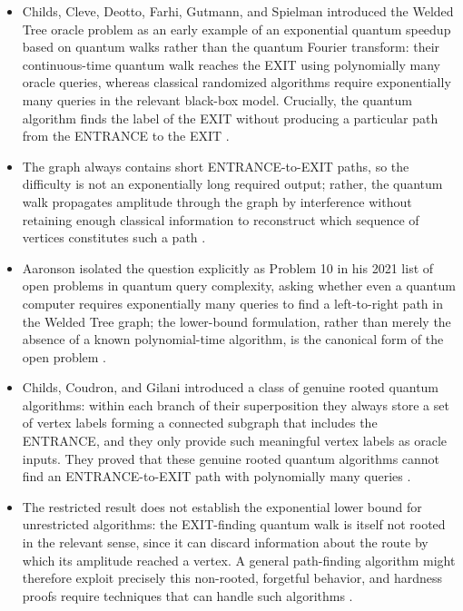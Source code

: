 \begin{itemize}
  \item Childs, Cleve, Deotto, Farhi, Gutmann, and Spielman introduced the Welded
Tree oracle problem as an early example of an exponential quantum speedup
based on quantum walks rather than the quantum Fourier transform: their
continuous-time quantum walk reaches the EXIT using polynomially many oracle
queries, whereas classical randomized algorithms require exponentially many
queries in the relevant black-box model.  Crucially, the quantum algorithm
finds the label of the EXIT without producing a particular path from the
ENTRANCE to the EXIT
.

  \item The graph always contains short ENTRANCE-to-EXIT paths, so the difficulty
is not an exponentially long required output; rather, the quantum walk
propagates amplitude through the graph by interference without retaining
enough classical information to reconstruct which sequence of vertices
constitutes such a path
.

  \item Aaronson isolated the question explicitly as Problem 10 in his 2021 list
of open problems in quantum query complexity, asking whether even a quantum
computer requires exponentially many queries to find a left-to-right path in
the Welded Tree graph; the lower-bound formulation, rather than merely the
absence of a known polynomial-time algorithm, is the canonical form of the
open problem
.

  \item Childs, Coudron, and Gilani introduced a class of genuine rooted quantum
algorithms: within each branch of their superposition they always store a
set of vertex labels forming a connected subgraph that includes the
ENTRANCE, and they only provide such meaningful vertex labels as oracle
inputs.  They proved that these genuine rooted quantum algorithms cannot
find an ENTRANCE-to-EXIT path with polynomially many queries
.

  \item The restricted result does not establish the exponential lower bound for
unrestricted algorithms: the EXIT-finding quantum walk is itself not rooted
in the relevant sense, since it can discard information about the route by
which its amplitude reached a vertex.  A general path-finding algorithm
might therefore exploit precisely this non-rooted, forgetful behavior, and
hardness proofs require techniques that can handle such algorithms
.


\end{itemize}
